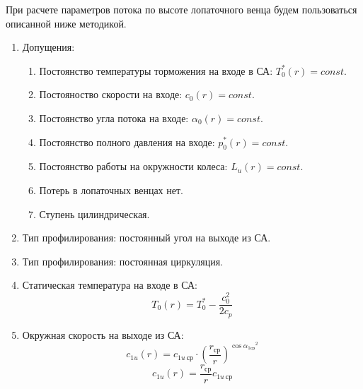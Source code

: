 \documentclass[a4paper,10pt]{article}
\begin{document}

    При расчете параметров потока по высоте лопаточного венца будем пользоваться описанной ниже методикой.

    \begin{enumerate}

        \item Допущения:

        \begin{enumerate}

            \item Постоянство температуры торможения на входе в СА: $T_0^*(r) = const$.
            \item Постояноство скорости на входе: $c_0(r) = const$.
            \item Постоянство угла потока на входе: $\alpha_0(r) = const$.
            \item Постоянство полного давления на входе: $p_0^*(r) = const$.
            \item Постоянство работы на окружности колеса: $L_u(r) = const$.
            \item Потерь в лопаточных венцах нет.
            \item Ступень цилиндрическая.

        \end{enumerate}


        \item Тип профилирования: постоянный угол на выходе из СА.


        \item Тип профилирования: постоянная циркуляция.


        \item Статическая температура на входе в СА:
        \[
            T_0(r) = T_0^* - \frac{c_0 ^ 2}{2 c_p}
        \]

        \item Окружная скорость на выходе из СА:
        \[
            c_{1u}(r) = c_{1u\ ср} \cdot \left( \frac{r_{ср}}{r} \right) ^
                {\cos{\alpha_{1ср}} ^ 2}
        \]
        \[
            c_{1u}(r) = \frac{r_{ср}}{r} c_{1u\ ср}
        \]


\end{enumerate}
\end{document}
